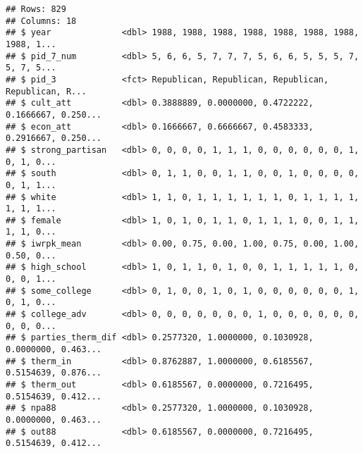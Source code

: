 \documentclass[
]{article}
\newenvironment{Shaded}{\begin{snugshade}}{\end{snugshade}}
\newcommand{\DecValTok}[1]{\textcolor[rgb]{0.00,0.00,0.81}{#1}}
\newcommand{\KeywordTok}[1]{\textcolor[rgb]{0.13,0.29,0.53}{\textbf{#1}}}
\newcommand{\NormalTok}[1]{#1}
\newcommand{\OperatorTok}[1]{\textcolor[rgb]{0.81,0.36,0.00}{\textbf{#1}}}
\newcommand{\StringTok}[1]{\textcolor[rgb]{0.31,0.60,0.02}{#1}}
\begin{document}
\begin{verbatim}
## Rows: 829
## Columns: 18
## $ year              <dbl> 1988, 1988, 1988, 1988, 1988, 1988, 1988, 1988, 1...
## $ pid_7_num         <dbl> 5, 6, 6, 5, 7, 7, 7, 5, 6, 6, 5, 5, 5, 7, 5, 7, 5...
## $ pid_3             <fct> Republican, Republican, Republican, Republican, R...
## $ cult_att          <dbl> 0.3888889, 0.0000000, 0.4722222, 0.1666667, 0.250...
## $ econ_att          <dbl> 0.1666667, 0.6666667, 0.4583333, 0.2916667, 0.250...
## $ strong_partisan   <dbl> 0, 0, 0, 0, 1, 1, 1, 0, 0, 0, 0, 0, 0, 1, 0, 1, 0...
## $ south             <dbl> 0, 1, 1, 0, 0, 1, 1, 0, 0, 1, 0, 0, 0, 0, 0, 1, 1...
## $ white             <dbl> 1, 1, 0, 1, 1, 1, 1, 1, 1, 0, 1, 1, 1, 1, 1, 1, 1...
## $ female            <dbl> 1, 0, 1, 0, 1, 1, 0, 1, 1, 1, 0, 0, 1, 1, 1, 1, 0...
## $ iwrpk_mean        <dbl> 0.00, 0.75, 0.00, 1.00, 0.75, 0.00, 1.00, 0.50, 0...
## $ high_school       <dbl> 1, 0, 1, 1, 0, 1, 0, 0, 1, 1, 1, 1, 1, 0, 0, 0, 1...
## $ some_college      <dbl> 0, 1, 0, 0, 1, 0, 1, 0, 0, 0, 0, 0, 0, 1, 0, 1, 0...
## $ college_adv       <dbl> 0, 0, 0, 0, 0, 0, 0, 1, 0, 0, 0, 0, 0, 0, 0, 0, 0...
## $ parties_therm_dif <dbl> 0.2577320, 1.0000000, 0.1030928, 0.0000000, 0.463...
## $ therm_in          <dbl> 0.8762887, 1.0000000, 0.6185567, 0.5154639, 0.876...
## $ therm_out         <dbl> 0.6185567, 0.0000000, 0.7216495, 0.5154639, 0.412...
## $ npa88             <dbl> 0.2577320, 1.0000000, 0.1030928, 0.0000000, 0.463...
## $ out88             <dbl> 0.6185567, 0.0000000, 0.7216495, 0.5154639, 0.412...
\end{verbatim}

\begin{Shaded}
\end{Shaded}
\end{document}
